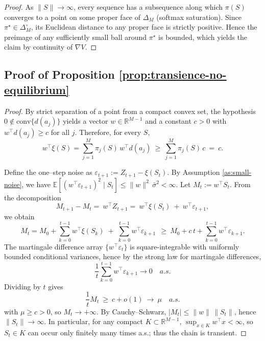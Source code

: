 \documentclass[12pt]{article}
\newcommand{\E}{\mathbb{E}}
\newcommand{\R}{\mathbb{R}}
\begin{document}
    \begin{proof}
    As $\|S\|\to\infty$, every sequence has a subsequence along which $\pi(S)$ converges to a point on some proper face of $\Delta_M$ (softmax saturation). Since $\pi^\star\in\Delta_M^\circ$, its Euclidean distance to any proper face is strictly positive. Hence the preimage of any sufficiently small ball around $\pi^\star$ is bounded, which yields the claim by continuity of $\nabla V$.
    \end{proof}


\subsection{Proof of Proposition \ref{prop:transience-no-equilibrium}}


\begin{proof}
    By strict separation of a point from a compact convex set, the hypothesis $0\notin\mathrm{conv}\{d(a_j)\}$ yields a vector $w\in\R^{M-1}$ and a constant $c>0$ with
    $w^\top d(a_j)\ge c$ for all $j$.
    Therefore, for every $S$,
    \[
    w^\top \xi(S)
    =\sum_{j=1}^M \pi_j(S)\,w^\top d(a_j)
    \ \ge\ \sum_{j=1}^M \pi_j(S)\,c
    \ =\ c.
    \]
    
    Define the one–step noise as $\varepsilon_{t+1}:=Z_{t+1}-\xi(S_t)$. By Assumption \ref{as:small-noise}, we have
    $\E[(w^\top \varepsilon_{t+1})^2\mid S_t]\le \|w\|^2\,\bar\sigma^2<\infty$.
    Let $M_t:=w^\top S_t$.
    From the decomposition
    \[
    M_{t+1}-M_t
    =\ w^\top Z_{t+1}
    =\ w^\top \xi(S_t)\ +\ w^\top \varepsilon_{t+1},
    \]
    we obtain
    \[
    M_t
    = M_0+\sum_{k=0}^{t-1} w^\top \xi(S_k)\;+\;\sum_{k=0}^{t-1} w^\top \varepsilon_{k+1}
    \ \ \ge\ M_0 + c\,t + \sum_{k=0}^{t-1} w^\top \varepsilon_{k+1}.
    \]
    The martingale difference array $\{w^\top\varepsilon_{t}\}$ is square-integrable with uniformly bounded conditional variances, hence by the strong law for martingale differences,
    \[
    \frac{1}{t}\sum_{k=0}^{t-1} w^\top \varepsilon_{k+1}\to 0 \quad a.s.
    \] 
    Dividing by $t$ gives
    \[
    \frac{1}{t}M_t\ \ge\ c + o(1)\ \to\ \mu \quad a.s.
    \]
    with $\mu\ge c>0$, so $M_t\to +\infty$.
    By Cauchy–Schwarz, $|M_t|\le \|w\|\,\|S_t\|$, hence $\|S_t\|\to\infty$.
    In particular, for any compact $K\subset\mathbb{R}^{M-1}$,
    $\sup_{x\in K} w^\top x<\infty$, so $S_t\in K$ can occur only finitely many times a.s.; thus the chain is transient.
    

\end{proof}
\end{document}
